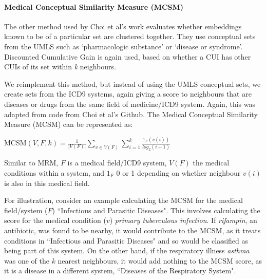 \documentclass[11pt,a4paper]{article}
\begin{document}
\paragraph{Medical Conceptual Similarity Measure (MCSM)} The other method used by Choi et al's work evaluates whether embeddings known to be of a particular set are clustered together. They use conceptual sets from the UMLS such as `pharmacologic substance' or `disease or syndrome'.  Discounted Cumulative Gain is again used, based on whether a CUI has other CUIs of its set within \emph{k} neighbours. 

We reimplement this method, but instead of using the UMLS conceptual sets, we create sets from the ICD9 systems, again giving a score to neighbours that are diseases or drugs from the same field of medicine/ICD9 system. Again, this was adapted from code from Choi et al's Github. The Medical Conceptual Similarity Measure (MCSM) can be represented as:

MCSM$(V,F,k) = \frac{1}{|V(F)|}\sum\limits_{v\in V(F)}\sum\limits_{i=1}^k \frac{1_F(v(i))}{log_2(i+1)}$

Similar to MRM, $F$ is a medical field/ICD9 system, $V(F)$ the medical conditions within a system, and $1_F$ 0 or 1 depending on whether neighbour $v(i)$ is also in this medical field.

For illustration, consider an example calculating the MCSM for the medical field/system ($F$) ``Infectious and Parasitic Diseases". This involves calculating the score for the medical condition ($v$) \emph{primary tuberculous infection}. If \emph{rifampin}, an antibiotic, was found to be nearby, it would contribute to the MCSM, as it treats conditions in ``Infectious and Parasitic Diseases" and so would be classified as being part of this system. On the other hand, if the respiratory illness \emph{asthma} was one of the $k$ nearest neighbours, it would add nothing to the MCSM score, as it is a disease in a different system, ``Diseases of the Respiratory System". 

%
\end{document}
